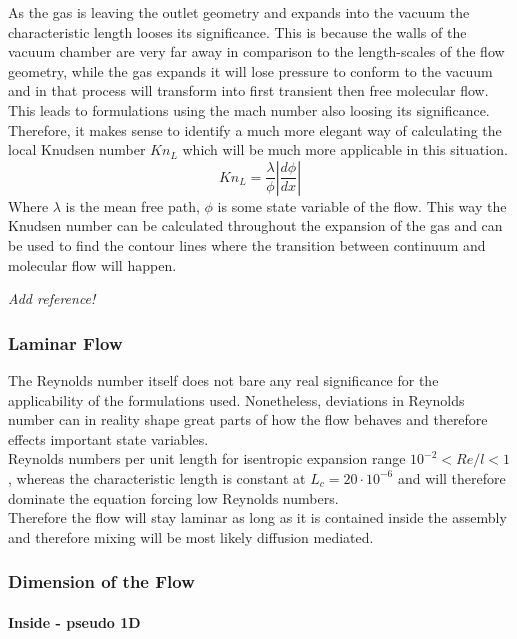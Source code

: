 	As the gas is leaving the outlet geometry and expands into the vacuum the characteristic length looses its significance.
	This is because the walls of the vacuum chamber are very far away in comparison to the length-scales of the flow geometry, while the gas expands it will lose pressure to conform to the vacuum and in that process will transform into first transient then free molecular flow.
	This leads to formulations using the mach number also loosing its significance.
	Therefore, it makes sense to identify a much more elegant way of calculating the local Knudsen number $Kn_L$ which will be much more applicable in this situation.
	$$
		K n_L = \frac{\lambda}{\phi} \left| \frac{d\phi}{dx} \right|
	$$
	Where $\lambda$ is the mean free path, $\phi$ is some state variable of the flow.
	This way the Knudsen number can be calculated throughout the expansion of the gas and can be used to find the contour lines where the transition between continuum and molecular flow will happen. 

{\color{greenColor}\itshape
Add reference!
}

\subsubsection{Laminar Flow}

	The Reynolds number itself does not bare any real significance for the applicability of the formulations used. Nonetheless, deviations in Reynolds number can in reality shape great parts of how the flow behaves and therefore effects important state variables.\\
	Reynolds numbers per unit length for isentropic expansion range $10^{-2} < Re/l < 1$, whereas the characteristic length is constant at $L_c = 20\cdot 10^{-6}$ and will therefore dominate the equation forcing low Reynolds numbers. \cite{ames1953compressible}\\
	Therefore the flow will stay laminar as long as it is contained inside the assembly and therefore mixing will be most likely diffusion mediated.
	\cite{comsol_microfluidics_guide}
	
\subsubsection{Dimension of the Flow}

	\paragraph{Inside - pseudo 1D}


